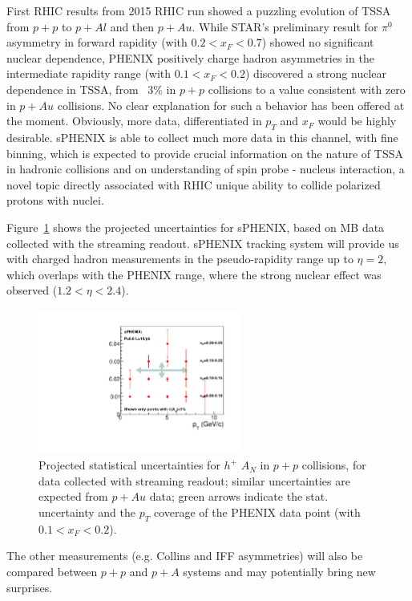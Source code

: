 First RHIC results from 2015 RHIC run showed a puzzling evolution of TSSA from $p+p$ to $p+Al$ and then $p+Au$. While STAR's preliminary result for $\pi^{0}$ asymmetry in forward rapidity (with $0.2<x_F<0.7$) showed no significant nuclear dependence, PHENIX positively charge hadron asymmetries in the intermediate rapidity range (with $0.1<x_F<0.2$) discovered a strong nuclear dependence in TSSA, from ~3\% in $p+p$ collisions to a value consistent with zero in $p+Au$ collisions. No clear explanation for such a behavior has been offered at the moment. Obviously, more data, differentiated in $p_T$ and $x_F$ would be highly desirable. sPHENIX is able to collect much more data in this channel, with fine binning, which is expected to provide crucial information on the nature of TSSA in hadronic collisions and on understanding of spin probe - nucleus interaction, a novel topic directly associated with RHIC unique ability to collide polarized protons with nuclei.

Figure~\ref{fig:AN_h} shows the projected uncertainties for sPHENIX, based on MB data collected with the streaming readout. sPHENIX tracking system will provide us with charged hadron measurements in the pseudo-rapidity range up to $\eta=2$, which overlaps with the PHENIX range, where the strong nuclear effect was observed ($1.2<\eta<2.4$).

\begin{figure}[htbp]
\centering
\includegraphics[width=0.60\textwidth]{figs/sphenix_han.pdf}
\caption{Projected statistical uncertainties for $h^{+}$ $A_N$ in $p+p$ collisions, for data collected with streaming readout; similar uncertainties are expected from $p+Au$ data; green arrows indicate the stat. uncertainty and the $p_T$ coverage of the PHENIX data point (with $0.1<x_F<0.2$).}
\label{fig:AN_h}
\end{figure}

The other measurements (e.g. Collins and IFF asymmetries) will also be compared between $p+p$ and $p+A$ systems and may potentially bring new surprises.


